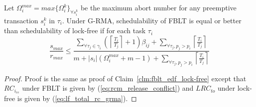 %
\begin{clm}\label{clm:fblt_rma_lock-free}
%
Let $\Omega_i^{max}=max\{\Omega_i^k\}_{\forall s_i^k}$ be the maximum abort number for any preemptive transaction $s_i^k$ in $\tau_i$. Under G-RMA, schedulability of FBLT is equal or better than schedulability of lock-free if for each task $\tau_i$ 
%
\begin{equation*}
\frac{s_{max}}{r_{max}}\le\frac{\sum_{\forall\tau_{j}\in\gamma_{i}}\left(\left\lceil \frac{T_{i}}{T_{j}}\right\rceil +1\right)\beta_{ij}+\sum_{\forall\tau_{j},p_{j}>p_{i}}\left\lceil \frac{T_{i}}{T_{j}}\right\rceil }{m+|s_{i}|\left(\Omega_{i}^{max}+m-1\right)+\sum_{\forall\tau_{j},p_{j}>p_{i}}\left\lceil \frac{T_{i}}{T_{j}}\right\rceil }
\end{equation*}
%
\end{clm}
%
\begin{proof}
%
Proof is the same as proof of Claim~\ref{clm:fblt_edf_lock-free} except that $RC_{i_{re}}$ under FBLT is given by (\ref{eq:rcm_release_conflict}) and $LRC_{to}$ under lock-free is given by (\ref{eq:lf_total_rc_grma}).
%
\end{proof}
%

